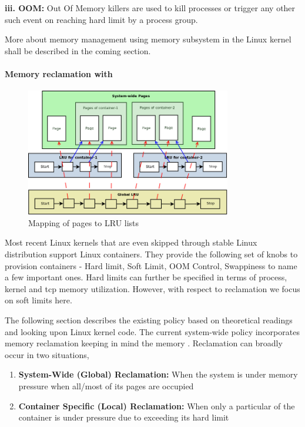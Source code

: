       \textbf{iii. OOM:} Out Of Memory killers are used to kill processes or trigger any other such event on reaching hard limit by a 
process group. 

	More about memory management using memory subsystem in the Linux kernel shall be described in the coming section.
	
	\paragraph{Memory reclamation with \cg{}}
	
      \begin{figure}
	\centering
	\includegraphics[width=0.8\textwidth]{images/background/page_mapping.png}
	\caption{Mapping of pages to LRU lists}
	\label{img_page_mapping}
      \end{figure}
      
      Most recent Linux kernels that are even skipped through stable Linux distribution support Linux containers. They provide the 
following set of knobs to provision containers - Hard limit, Soft Limit, OOM Control, Swappiness to name a few important ones. Hard limits 
can further be specified in terms of process, kernel and tcp memory utilization. However, with respect to reclamation we focus on soft 
limits here.
    
      The following section describes the existing policy based on theoretical readings and looking upon Linux kernel code. The current 
system-wide policy incorporates memory reclamation keeping in mind the memory \cg{}. Reclamation can broadly occur in two situations,
      \begin{enumerate}
	\item \textbf{System-Wide (Global) Reclamation:} When the system is under memory pressure when all/most of its pages are occupied
	\item \textbf{Container Specific (Local) Reclamation:} When only a particular of the container is under pressure due to exceeding 
its hard limit
      \end{enumerate}
      
